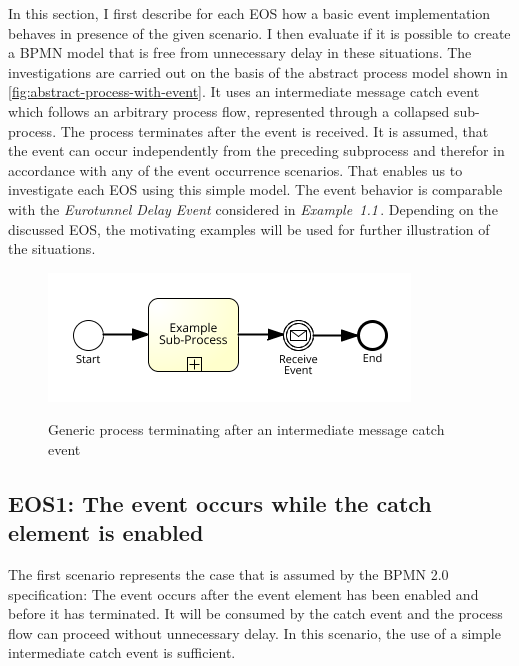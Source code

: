 In this section, I first describe for each \ac{EOS} how a basic event implementation behaves in presence of the given scenario.
I then evaluate if it is possible to create a BPMN model that is free from unnecessary delay in these situations.
The investigations are carried out on the basis of the abstract process model shown in \autoref{fig:abstract-process-with-event}.
It uses an intermediate message catch event which follows an arbitrary process flow, represented through a collapsed sub-process.
The process terminates after the event is received.
It is assumed, that the event can occur independently from the preceding subprocess and therefor in accordance with any of the event occurrence scenarios. That enables us to investigate each EOS using this simple model.
The event behavior is comparable with the \textit{Eurotunnel Delay Event} considered in \textit{Example~1.1}\,. Depending on the discussed EOS, the motivating examples will be used for further illustration of the situations.



\begin{figure}[]
	\myfloatalign
	{\includegraphics[width=0.7\linewidth]{chapters/assessment/generic-process-with-interm-event.png}}
	\caption{Generic process terminating after an intermediate message catch event}\label{fig:abstract-process-with-event}
\end{figure}


\subsection*{EOS1: The event occurs while the catch element is enabled}

The first scenario represents the case that is assumed by the BPMN 2.0 specification: 
The event occurs after the event element has been enabled and before it has terminated. It will be consumed by the catch event and the process flow can proceed without unnecessary delay.
In this scenario, the use of a simple intermediate catch event is sufficient.


